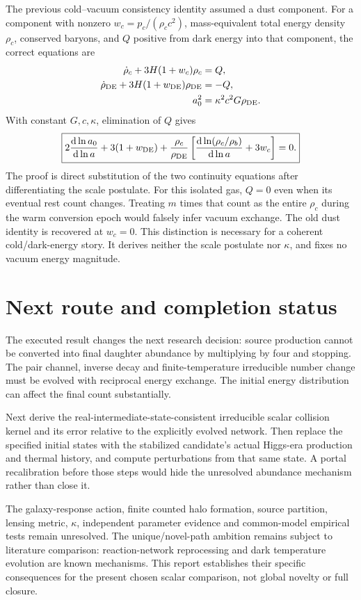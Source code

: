 \documentclass[11pt]{article}
\newcommand{\dd}{\mathrm d}
\begin{document}
The previous cold--vacuum consistency identity assumed a dust component.
For a component with nonzero $w_c=p_c/(\rho_cc^2)$, mass-equivalent total
energy density $\rho_c$, conserved baryons, and $Q$ positive from dark
energy into that component, the correct equations are
\begin{align}
 \dot\rho_c+3H(1+w_c)\rho_c&=Q,\\
 \dot\rho_{\rm DE}+3H(1+w_{\rm DE})\rho_{\rm DE}&=-Q,\\
 a_0^2&=\kappa^2c^2G\rho_{\rm DE}.
\end{align}
With constant $G,c,\kappa$, elimination of $Q$ gives
\begin{equation}
 \boxed{2\frac{\dd\ln a_0}{\dd\ln a}+3(1+w_{\rm DE})
 +\frac{\rho_c}{\rho_{\rm DE}}
 \left[\frac{\dd\ln(\rho_c/\rho_b)}{\dd\ln a}+3w_c\right]=0.}
\end{equation}
The proof is direct substitution of the two continuity equations after
differentiating the scale postulate. For this isolated gas, $Q=0$ even
when its eventual rest count changes. Treating $m$ times that count as
the entire $\rho_c$ during the warm conversion epoch would falsely infer
vacuum exchange. The old dust identity is recovered at $w_c=0$.
This distinction is necessary for a coherent cold/dark-energy story.
It derives neither the scale postulate nor $\kappa$, and fixes no vacuum
energy magnitude.

\section{Next route and completion status}
The executed result changes the next research decision: source production
cannot be converted into final daughter abundance by multiplying by four
and stopping. The pair channel, inverse decay and finite-temperature
irreducible number change must be evolved with reciprocal energy exchange.
The initial energy distribution can affect the final count substantially.

Next derive the real-intermediate-state-consistent irreducible scalar
collision kernel and its error relative to the explicitly evolved network.
Then replace the specified initial states with the stabilized candidate's
actual Higgs-era production and thermal history, and compute perturbations
from that same state. A portal recalibration before those steps would hide
the unresolved abundance mechanism rather than close it.

The galaxy-response action, finite counted halo formation, source partition,
lensing metric, $\kappa$, independent parameter evidence and common-model
empirical tests remain unresolved. The unique/novel-path ambition remains
subject to literature comparison: reaction-network reprocessing and dark
temperature evolution are known mechanisms. This report establishes their
specific consequences for the present chosen scalar comparison, not global
novelty or full closure.
\end{document}
